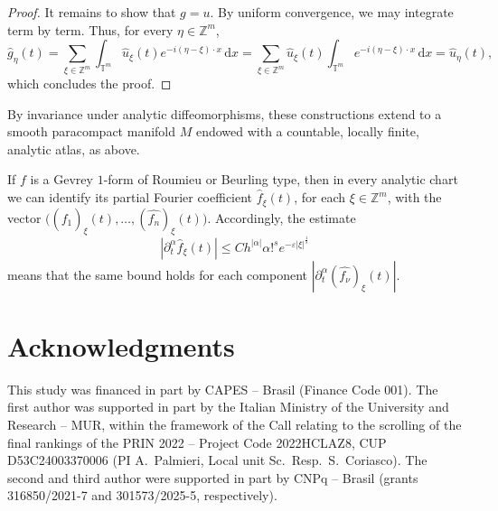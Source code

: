 \documentclass[11pt,reqno]{amsart}
\numberwithin{equation}{section}
\begin{document}
\begin{proof}
	It remains to show that \(g=u\).
	By uniform convergence, we may integrate term by term. Thus, for every \(\eta\in\mathbb{Z}^m\),
	\[
	\widehat{g}_\eta(t)
	=
	\sum_{\xi\in\mathbb{Z}^m}\int_{\mathbb{T}^m}\widehat{u}_\xi(t)e^{-i(\eta-\xi)\cdot x}\,\mathrm{d}x
	=
	\sum_{\xi\in\mathbb{Z}^m}\widehat{u}_\xi(t)\int_{\mathbb{T}^m} e^{-i(\eta-\xi)\cdot x}\,\mathrm{d}x
	=
	\widehat{u}_\eta(t),
	\]
	which concludes the proof.
\end{proof}

By invariance under analytic diffeomorphisms, these constructions extend to a smooth paracompact manifold \(M\) endowed with a countable, locally finite, analytic atlas, as above.

If \(f\) is a Gevrey \(1\)-form of Roumieu or Beurling type, then in every analytic chart we can identify its partial Fourier coefficient \(\widehat{f}_\xi(t)\), for each \(\xi\in\mathbb{Z}^m\), with the vector
\(\bigl((\widehat{f_1})_\xi(t),\dots,(\widehat{f_n})_\xi(t)\bigr)\).
Accordingly, the estimate
\[
|\partial_t^{\alpha}\widehat{f}_\xi(t)|
\leq
Ch^{|\alpha|}\alpha!^s e^{-\varepsilon|\xi|^{\frac{1}{s}}}
\]
means that the same bound holds for each component \(|\partial_t^{\alpha}(\widehat{f_\nu})_\xi(t)|\).



\section*{Acknowledgments}

This study was financed in part by CAPES -- Brasil (Finance Code 001). The first author was supported in part by the Italian Ministry of the University and Research -- MUR, within the framework of the Call relating to the scrolling of the final rankings of the PRIN 2022 -- Project Code 2022HCLAZ8, CUP D53C24003370006 (PI A.~Palmieri, Local unit Sc.~Resp.~S.~Coriasco). 
The second and third author were supported in part by CNPq -- Brasil (grants 316850/2021-7 and 301573/2025-5, respectively).





\end{document}
